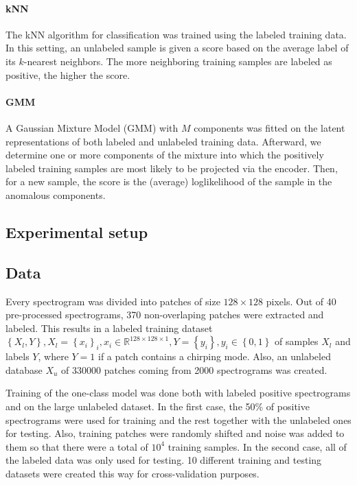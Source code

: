 \paragraph{kNN} The kNN algorithm for classification\cite{deng2016efficient} was trained using the labeled training data. In this setting, an unlabeled sample is given a score based on the average label of its $k$-nearest neighbors. The more neighboring training samples are labeled as positive, the higher the score.

\paragraph{GMM} A Gaussian Mixture Model (GMM)\cite{huang2005gaussian} with $M$ components was fitted on the latent representations of both labeled and unlabeled training data. Afterward, we determine one or more components of the mixture into which the positively labeled training samples are most likely to be projected via the encoder. Then, for a new sample, the score is the (average) loglikelihood of the sample in the anomalous components. 

\subsection{Experimental setup}

\subsection{Data}
Every spectrogram was divided into patches of size $128\times128$ pixels. Out of 40 pre-processed spectrograms, 370 non-overlaping patches were extracted and labeled. This results in a labeled training dataset $\left\{ X_{l},Y\right\} ,X_{l}=\left\{ x_{i}\right\} _{i},x_{i} \in \mathbb{R}^{128\times128\times1}, Y=\left\{ y_{i}\right\} ,y_{i}\in\left\{ 0,1\right\}$ of samples $X_{l}$ and labels $Y$, where $Y=1$ if a patch contains a chirping mode. Also, an unlabeled database $X_{u}$ of 330000 patches coming from 2000 spectrograms was created. 

Training of the one-class model was done both with labeled positive spectrograms and on the large unlabeled dataset. In the first case, the 50\% of positive spectrograms were used for training and the rest together with the unlabeled ones for testing. Also, training patches were randomly shifted and noise was added to them so that there were a total of $10^4$ training samples. In the second case, all of the labeled data was only used for testing. 10 different training and testing datasets were created this way for cross-validation purposes.

